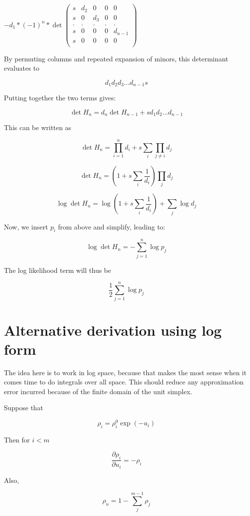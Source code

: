 \documentclass[12pt]{article}
\begin{document}
\begin{math}
-d_1 * (-1)^n * \det
\begin{pmatrix}
 s   & d_2   & 0   & 0 & 0 \\
 s   & 0     & d_3 & 0 & 0 \\
 .   & .     & .   & . & . \\
 s   & 0     & 0   & 0 & d_{n-1} \\
 s   & 0     & 0   & 0 & 0 \\
\end{pmatrix}
\end{math}

By permuting columns and repeated expansion of minors, this determinant evaluates to 

$$d_1 d_2 d_3 ... d_{n-1} s$$

Putting together the two terms gives:

$$\det H_n = d_n  \det H_{n-1} + s d_1 d_2 ... d_{n-1}$$

This can be written as

$$ \det H_n = \prod_{i=1}^n d_i + s \sum_i \prod_{j \ne i} d_j$$

$$\det H_n = (1 + s\sum_i \frac{1}{d_i}) \prod_j d_j$$

$$ \log \det H_n = \log(1 + s \sum_i \frac{1}{d_i}) + \sum_j \log d_j$$


Now, we insert $p_i$ from above and simplify, leading to:

$$\log \det H_n = -\sum_{j=1}^n \log p_j$$

The log likelihood term will thus be

$$\frac{1}{2}  \sum_{j=1}^n \log p_j $$

\section{Alternative derivation using log form}

The idea here is to work in log space, because that makes the most sense when it comes time to do integrals over all space.  This should reduce any approximation error incurred because of the finite domain of the unit simplex.  

Suppose that 

$$\rho_i = \rho_i^0 \exp(-u_i)$$

Then for $i < m$

$$\frac{\partial \rho_i}{\partial u_i} = - \rho_i$$

Also, 

$$\rho_n = 1 - \sum_j^{m-1} \rho_j$$
\end{document}
